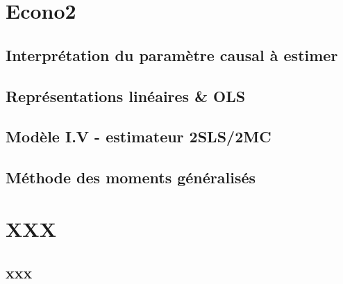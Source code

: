 \documentclass[12pt, french]{article}
\begin{document}

\newpage

\pagestyle{fancy}
\fancyhead[L]{}
\fancyhead[R]{}
\tableofcontents
\break

\pagestyle{fancy}
\fancyhead[L]{\leftmark}
\fancyhead[R]{}


\section{Econo2}

\subsection{Interprétation du paramètre causal à estimer}

\subsection{Représentations linéaires \& OLS}

\newpage
\subsection{Modèle I.V - estimateur 2SLS/2MC}

\subsection{Méthode des moments généralisés}


\newpage

\section{XXX}
%
\subsection{xxx}
%
\end{document}
